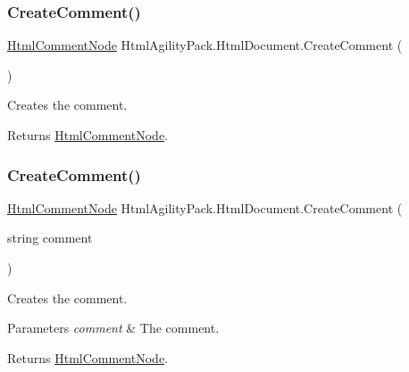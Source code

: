 \subsubsection{\texorpdfstring{Create\+Comment()}{CreateComment()}\hspace{0.1cm}{\footnotesize\ttfamily [1/2]}}
{\footnotesize\ttfamily \hyperlink{class_html_agility_pack_1_1_html_comment_node}{Html\+Comment\+Node} Html\+Agility\+Pack.\+Html\+Document.\+Create\+Comment (\begin{DoxyParamCaption}{ }\end{DoxyParamCaption})\hspace{0.3cm}{\ttfamily [inline]}}



Creates the comment. 

\begin{DoxyReturn}{Returns}
\hyperlink{class_html_agility_pack_1_1_html_comment_node}{Html\+Comment\+Node}.
\end{DoxyReturn}
\mbox{\label{class_html_agility_pack_1_1_html_document_a36a57131b52c2c568ebc5a4681fda518}} 
\subsubsection{\texorpdfstring{Create\+Comment()}{CreateComment()}\hspace{0.1cm}{\footnotesize\ttfamily [2/2]}}
{\footnotesize\ttfamily \hyperlink{class_html_agility_pack_1_1_html_comment_node}{Html\+Comment\+Node} Html\+Agility\+Pack.\+Html\+Document.\+Create\+Comment (\begin{DoxyParamCaption}\item[{string}]{comment }\end{DoxyParamCaption})\hspace{0.3cm}{\ttfamily [inline]}}



Creates the comment. 


\begin{DoxyParams}{Parameters}
{\em comment} & The comment.\\
\hline
\end{DoxyParams}
\begin{DoxyReturn}{Returns}
\hyperlink{class_html_agility_pack_1_1_html_comment_node}{Html\+Comment\+Node}.
\end{DoxyReturn}

